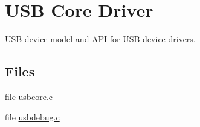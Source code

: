 \hypertarget{group__usbcore}{\section{U\-S\-B Core Driver}
\label{group__usbcore}
}


U\-S\-B device model and A\-P\-I for U\-S\-B device drivers.  


\subsection*{Files}
\begin{DoxyCompactItemize}
\item 
file \hyperlink{usbcore_8c}{usbcore.\-c}
\item 
file \hyperlink{usbdebug_8c}{usbdebug.\-c}
\end{DoxyCompactItemize}
